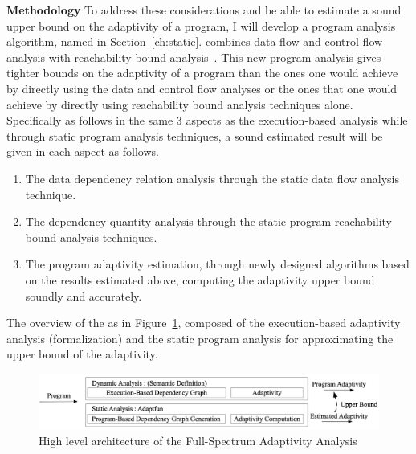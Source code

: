 \begin{itemize}
\textbf{Methodology}
To address these considerations and be able to estimate a sound upper bound on the adaptivity of a program, 
I will develop a program analysis algorithm, named {\THESYSTEM} in Section~\ref{ch:static}.
{\THESYSTEM} combines data flow and control flow analysis with reachability bound analysis~\cite{GulwaniZ10}. 
This new program analysis gives tighter bounds on the adaptivity of a program than the ones one would achieve by directly using the data and control flow analyses or the ones that one would achieve by directly using reachability bound analysis techniques alone. Specifically as follows in the same 3 aspects as the execution-based analysis 
while through static program analysis techniques, a sound estimated result will be given in each aspect as follows.
\begin{enumerate}
\item The data dependency relation analysis through the static data flow analysis technique.
\item The dependency quantity analysis through the static program reachability bound analysis techniques.
\item The program adaptivity estimation, through newly designed algorithms based on the results estimated above, 
computing the adaptivity upper bound soundly 
and accurately.
\end{enumerate}
The overview of the  as in Figure~\ref{fig:structure}, composed of the execution-based adaptivity analysis (formalization)
and the static program analysis for approximating the upper bound of the 
adaptivity.
\begin{figure}
   \centering   
   \includegraphics[width=1.0\textwidth]{figures/architecture.png}
  \caption{High level architecture of the Full-Spectrum Adaptivity Analysis}
   \label{fig:structure}
\end{figure}
\end{itemize}%


